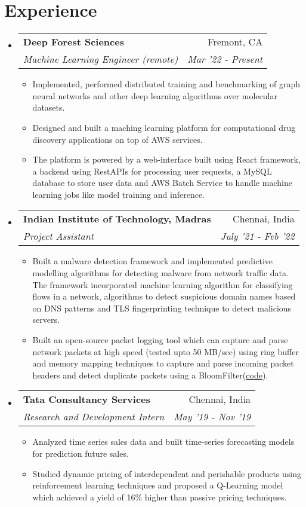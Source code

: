 \documentclass[letterpaper,11pt]{article}
\makeatletter
\newcommand{\resumeItem}[2]{
  \item\small{
    \textbf{#1}{: #2 \vspace{-2pt}}
  }
}
\newcommand{\resumeSubheading}[4]{
  \vspace{-1pt}\item
    \begin{tabular*}{0.97\textwidth}[t]{l@{\extracolsep{\fill}}r}
      \textbf{#1} & #2 \\
      \textit{\small#3} & \textit{\small #4} \\
    \end{tabular*}\vspace{-5pt}
}
\newcommand{\resumeSubSubheading}[2]{
    \begin{tabular*}{0.97\textwidth}{l@{\extracolsep{\fill}}r}
      \textit{\small#1} & \textit{\small #2} \\
    \end{tabular*}\vspace{-5pt}
}
\newcommand{\resumeSubHeadingListStart}{\begin{itemize}[leftmargin=*]}
\newcommand{\resumeSubHeadingListEnd}{\end{itemize}}
\newcommand{\resumeItemListStart}{\begin{itemize}}
\newcommand{\resumeItemListEnd}{\end{itemize}\vspace{-5pt}}
\makeatother
\begin{document}
\section{Experience}
  \resumeSubHeadingListStart
    \resumeSubheading
      {Deep Forest Sciences}{Fremont, CA}
      {Machine Learning Engineer (remote)}{Mar '22 - Present}
      \resumeItemListStart
        \item Implemented, performed distributed training and benchmarking of graph neural networks and other deep learning algorithms over molecular datasets.
        \item Designed and built a maching learning platform for computational drug discovery applications on top of AWS services.
        \item The platform is powered by a web-interface built using React framework, a backend using RestAPIs for processing user requests, a MySQL database to store user data and AWS Batch Service to handle machine learning jobs like model training and inference. 
      \resumeItemListEnd

    \resumeSubheading
      {Indian Institute of Technology, Madras}{Chennai, India}
      {Project Assistant}{July '21 - Feb '22}
      \resumeItemListStart
        \item Built a malware detection framework and implemented predictive modelling algorithms for detecting malware from network traffic data. The framework incorporated machine learning algorithm for classifying flows in a network, algorithms to detect suspicious domain names based on DNS patterns and TLS fingerprinting technique to detect malicious servers.
        \item Built an open-source packet logging tool which can capture and parse network packets at high speed (tested upto 50 MB/sec) using ring buffer and memory mapping techniques to capture and parse incoming packet headers and detect duplicate packets using a BloomFilter(\href{https://github.com/arunppsg/packet-sniffer}{code}).
      \resumeItemListEnd
     
    \resumeSubheading
      {Tata Consultancy Services}{Chennai, India}
      {Research and Development Intern}{May '19 - Nov '19}
      \resumeItemListStart
        \item Analyzed time series sales data and built time-series forecasting models for prediction future sales.
        \item Studied dynamic pricing of interdependent and perishable products using reinforcement learning techniques and proposed a Q-Learning model which achieved a yield of 16\% higher than passive pricing techniques.
      \resumeItemListEnd
  \resumeSubHeadingListEnd
\end{document}

